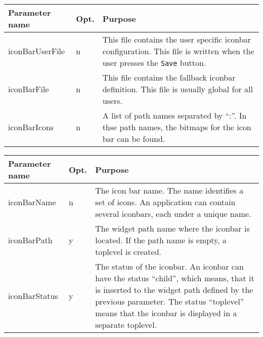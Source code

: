 {\newpage
\clearpage
\samepage \begin{figure}[ht]
  \centerline{
  \epsfysize=7cm
  }

  \label{fig:FontBox}
\end{figure}
}

{\newpage
\clearpage
\samepage \begin{tabular}{|l|l|p{6.5cm}|} \hline
Parameter name  & Opt. & Purpose\\  \hline
iconBarUserFile & n    & This file contains the user
                         specific iconbar configuration.
                         This file is written when the user
                         presses the {\tt Save\tt} button.\\  \hline
iconBarFile     & n    & This file contains the
                         fallback iconbar definition. This
                         file is usually global for all
                         users.\\  \hline
iconBarIcons    & n    & A list of path names separated by
                         ``:''. In thse path names, the
                         bitmaps for the icon bar can be
                         found.\\  \hline
\end{tabular}
}

{\newpage
\clearpage
\samepage \begin{tabular}{|l|l|p{6.5cm}|} \hline
Parameter name  & Opt. & Purpose\\  \hline
iconBarName     & n    & The icon bar name. The name
                         identifies a set of icons. An
                         application can contain several
                         iconbars, each under a unique
                         name.\\  \hline
iconBarPath     & y    & The widget path name where the
                         iconbar is located. If the path
                         name is empty, a toplevel is
                         created.\\  \hline
iconBarStatus   & y    & The status of the iconbar. An
                         iconbar can have the status
                         ``child'', which means, that it is
                         inserted to the widget path defined
                         by the previous parameter. The
                         status ``toplevel'' means that the
                         iconbar is displayed in a separate
                         toplevel.\\  \hline
\end{tabular}
}

